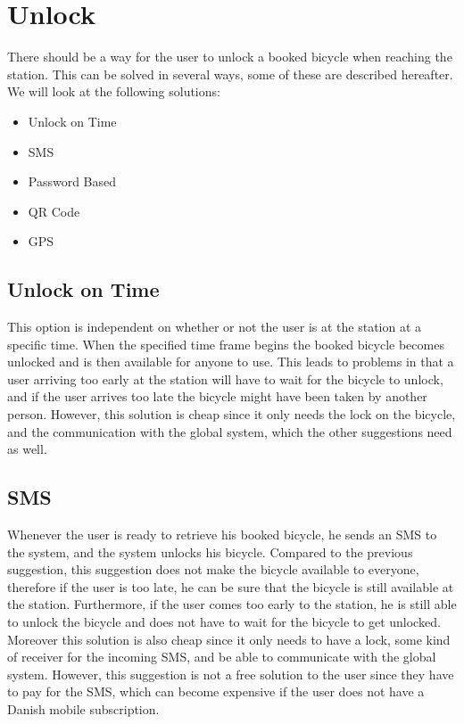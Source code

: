 \section{Unlock}\label{sec:Lock}
There should be a way for the user to unlock a booked bicycle when reaching the station.
This can be solved in several ways, some of these are described hereafter.
We will look at the following solutions:

\begin{itemize}
	\item Unlock on Time
	\item SMS
	\item Password Based
	\item QR Code
	\item GPS
\end{itemize}

\subsection{Unlock on Time}
This option is independent on whether or not the user is at the station at a specific time.
When the specified time frame begins the booked bicycle becomes unlocked and is then available for anyone to use.
This leads to problems in that a user arriving too early at the station will have to wait for the bicycle to unlock, and if the user arrives too late the bicycle might have been taken by another person.
However, this solution is cheap since it only needs the lock on the bicycle, and the communication with the global system, which the other suggestions need as well.

\subsection{SMS}
Whenever the user is ready to retrieve his booked bicycle, he sends an SMS to the system, and the system unlocks his bicycle.
Compared to the previous suggestion, this suggestion does not make the bicycle available to everyone, therefore if the user is too late, he can be sure that the bicycle is still available at the station.
Furthermore, if the user comes too early to the station, he is still able to unlock the bicycle and does not have to wait for the bicycle to get unlocked.
Moreover this solution is also cheap since it only needs to have a lock, some kind of receiver for the incoming SMS, and be able to communicate with the global system.
However, this suggestion is not a free solution to the user since they have to pay for the SMS, which can become expensive if the user does not have a Danish mobile subscription.

